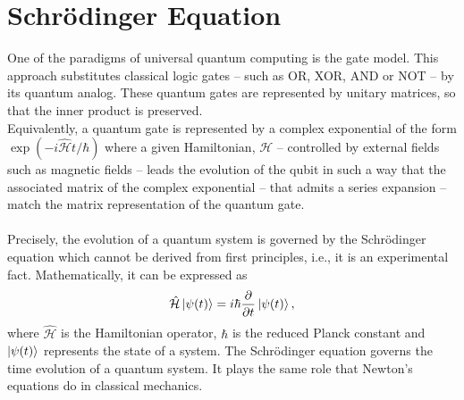 \section{Schrödinger Equation}
One of the paradigms of universal quantum computing is the gate model. This approach substitutes classical logic gates -- such as OR, XOR, AND or NOT -- by its quantum analog. These quantum gates are represented by unitary matrices, so that the inner product is preserved.\\
Equivalently, a quantum gate is represented by a complex exponential of the form $\exp\left(-i\hat{\mathcal{H}}t / \hbar\right)$ where a given Hamiltonian, $\mathcal{H}$ -- controlled by external fields such as magnetic fields -- leads the evolution of the qubit in such a way that the associated matrix of the complex exponential -- that admits a series expansion -- match the matrix representation of the quantum gate. \\\\
Precisely, the evolution of a quantum system is governed by the Schrödinger equation which cannot be derived from first principles, i.e., it is an experimental fact. Mathematically, it can be expressed as
\begin{equation}
    \hat{\mathcal{H}}\ket{\psi(t)} = i\hbar \frac{\partial}{\partial t}\ket{\psi(t)},
\end{equation}
where $\hat{\mathcal{H}}$ is the Hamiltonian operator, $\hbar$ is the reduced Planck constant and $\ket{\psi(t)}$ represents the state of a system. The Schrödinger equation governs the time evolution of a quantum system. It plays the same role that Newton's equations do in classical mechanics.
